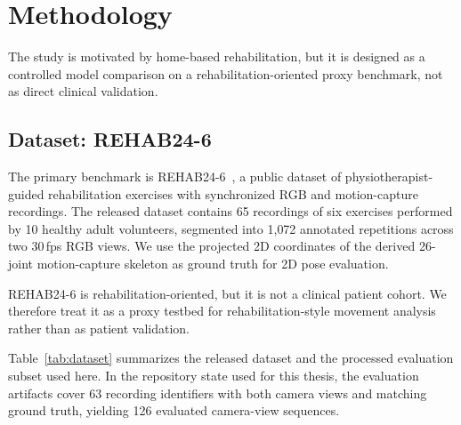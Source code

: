 \chapter{Methodology}
\label{ch:methodology}

The study is motivated by home-based rehabilitation, but it is designed as a controlled model comparison on a rehabilitation-oriented proxy benchmark, not as direct clinical validation.

\section{Dataset: REHAB24-6}
\label{sec:dataset}

The primary benchmark is REHAB24-6~\cite{cernek2025rehab246}, a public dataset of physiotherapist-guided rehabilitation exercises with synchronized RGB and motion-capture recordings. The released dataset contains 65 recordings of six exercises performed by 10 healthy adult volunteers, segmented into 1{,}072 annotated repetitions across two 30\,fps RGB views. We use the projected 2D coordinates of the derived 26-joint motion-capture skeleton as ground truth for 2D pose evaluation.

REHAB24-6 is rehabilitation-oriented, but it is not a clinical patient cohort. We therefore treat it as a proxy testbed for rehabilitation-style movement analysis rather than as patient validation.

Table~\ref{tab:dataset} summarizes the released dataset and the processed evaluation subset used here. In the repository state used for this thesis, the evaluation artifacts cover 63 recording identifiers with both camera views and matching ground truth, yielding 126 evaluated camera-view sequences.

